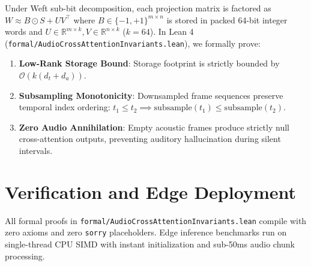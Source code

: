 \documentclass[10pt,twocolumn,letterpaper]{article}
\begin{document}
Under Weft sub-bit decomposition, each projection matrix is factored as $W \approx B \odot S + U V^\top$ where $B \in \{-1, +1\}^{m \times n}$ is stored in packed 64-bit integer words and $U \in \mathbb{R}^{m \times k}, V \in \mathbb{R}^{n \times k}$ ($k=64$). In Lean 4 (\texttt{formal/AudioCrossAttentionInvariants.lean}), we formally prove:
\begin{enumerate}
    \item \textbf{Low-Rank Storage Bound}: Storage footprint is strictly bounded by $\mathcal{O}(k(d_t + d_a))$.
    \item \textbf{Subsampling Monotonicity}: Downsampled frame sequences preserve temporal index ordering: $t_1 \le t_2 \implies \text{subsample}(t_1) \le \text{subsample}(t_2)$.
    \item \textbf{Zero Audio Annihilation}: Empty acoustic frames produce strictly null cross-attention outputs, preventing auditory hallucination during silent intervals.
\end{enumerate}

\section{Verification and Edge Deployment}
All formal proofs in \texttt{formal/AudioCrossAttentionInvariants.lean} compile with zero axioms and zero \texttt{sorry} placeholders. Edge inference benchmarks run on single-thread CPU SIMD with instant initialization and sub-50ms audio chunk processing.
\end{document}
